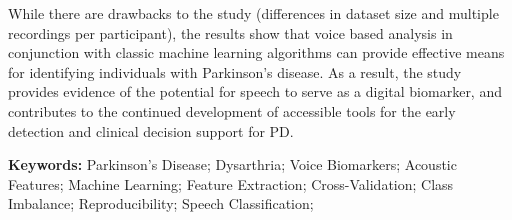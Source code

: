 While there are drawbacks to the study (differences in dataset size and multiple recordings per participant), the results show that voice based analysis in conjunction with classic machine learning algorithms can provide effective means for identifying individuals with Parkinson's disease. As a result, the study provides evidence of the potential for speech to serve as a digital biomarker, and contributes to the continued development of accessible tools for the early detection and clinical decision support for PD.
\vspace{1cm}

\textbf{Keywords:} Parkinson's Disease; Dysarthria; Voice Biomarkers; Acoustic Features; Machine Learning; Feature Extraction; Cross-Validation; Class Imbalance; Reproducibility; Speech Classification;
